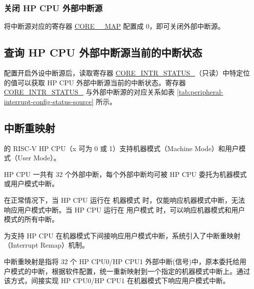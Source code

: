 \documentclass[main\_\_CN.tex]{subfiles}
\begin{document}
\subsubsection{关闭 HP CPU 外部中断源 }

将中断源对应的寄存器 \hyperref[fielddesc:CORE0SOURCEMAP]{CORE\_\_MAP} 配置成 0，即可关闭外部中断源。

\subsection{查询 HP CPU 外部中断源当前的中断状态}
配置开启外设中断源后，读取寄存器 \hyperref[fielddesc:CORE0INTRSTATUS0]{CORE\_INTR\_STATUS\_}（只读）中特定位的值可以获取 HP CPU 外部中断源当前的中断状态。寄存器 \hyperref[fielddesc:CORE0INTRSTATUS0]{CORE\_INTR\_STATUS\_} 与外部中断源的对应关系如表 \ref{tab:peripheral-interrupt-config-status-source} 所示。


\subsection{中断重映射}

\chipname{} 的 RISC-V HP CPU（x 可为 0 或 1）支持机器模式（Machine Mode）和用户模式（User Mode）。

HP CPU 一共有 32 个外部中断，每个外部中断均可被 HP CPU 委托为机器模式或用户模式中断。

在正常情况下，当 HP CPU 运行在 机器模式 时，仅能响应机器模式中断，无法响应用户模式中断。当 HP CPU 运行在 用户模式 时，可以响应机器模式和用户模式的所有中断。

为支持 HP CPU 在机器模式下间接响应用户模式中断，系统引入了中断重映射（Interrupt Remap）机制。

中断重映射是指将 32 个 HP CPU0/HP CPU1 外部中断(信号)中，原本委托给用户模式的中断，根据软件配置，统一重新映射到一个指定的机器模式中断上。通过该方式，间接实现 HP CPU0/HP CPU1 在机器模式下响应用户模式中断。
\end{document}
